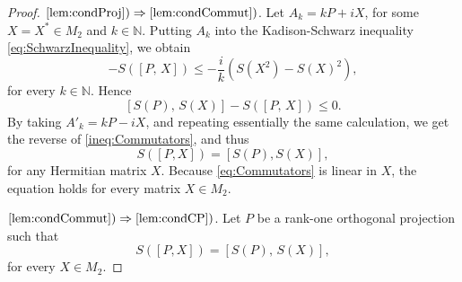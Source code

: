 \documentclass[12pt]{article}
\theoremstyle{plain}
\theoremstyle{definition}
\theoremstyle{remark}
\numberwithin{equation}{section}
\begin{document}
\begin{proof}
$\ref{lem:condProj}) \Rightarrow \ref{lem:condCommut})$.
Let $A_{k} = kP + iX$, for some $X = X^{*} \in M_2$ and
$k \in \mathbb{N}$.  Putting $A_{k}$ into the Kadison-Schwarz inequality
\eqref{eq:SchwarzInequality}, we obtain
\begin{equation}
[S(P), \,  S(X)] - S([P, \, X]) \leq - \frac{i}{k} (S(X^{2}) - S(X)^{2}),
\end{equation}
for every $k \in \mathbb{N}$.
Hence
\begin{equation}
\label{ineq:Commutators}
[S(P), \, S(X)] - S([P, \, X]) \leq 0.
\end{equation}
By taking $A'_{k} =kP - i X$, and repeating essentially the same
calculation, we get the reverse of \eqref{ineq:Commutators},
and thus
\begin{equation}
\label{eq:Commutators}
S([P, X]) = [S(P), S(X)],
\end{equation}
for any Hermitian matrix $X$.
Because \eqref{eq:Commutators} is linear in $X$,
the equation holds for every matrix $X \in M_{2}$.

$\ref{lem:condCommut}) \Rightarrow \ref{lem:condCP})$.
Let $P$ be a rank-one orthogonal projection such that
\begin{equation}
\label{eq:Commutator}
S([P,X]) = [S(P), \, S(X)],
\end{equation}
for every $X \in M_{2}$.


\end{proof}
\end{document}
